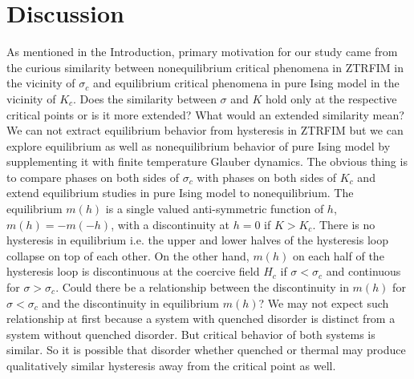 \documentclass[a4,aps,amsmath,floatfix,nofootinbib,10pt]{revtex4}
\begin{document}
\section{Discussion}


As mentioned in the Introduction, primary motivation for our study came 
from the curious similarity between nonequilibrium critical phenomena 
in ZTRFIM in the vicinity of $\sigma_c$ and equilibrium critical 
phenomena in pure Ising model in the vicinity of $K_c$. Does the 
similarity between $\sigma$ and $K$ hold only at the respective 
critical points or is it more extended? What would an extended 
similarity mean? We can not extract equilibrium behavior from 
hysteresis in ZTRFIM but we can explore equilibrium as well as 
nonequilibrium behavior of pure Ising model by supplementing it with 
finite temperature Glauber dynamics. The obvious thing is to compare 
phases on both sides of $\sigma_c$ with phases on both sides of $K_c$ 
and extend equilibrium studies in pure Ising model to nonequilibrium. 
The equilibrium $m(h)$ is a single valued anti-symmetric function of 
$h$, $m(h)=-m(-h)$, with a discontinuity at $h=0$ if $K > K_c$. There 
is no hysteresis in equilibrium i.e. the upper and lower halves of the 
hysteresis loop collapse on top of each other. On the other hand, 
$m(h)$ on each half of the hysteresis loop is discontinuous at the 
coercive field $H_c$ if $\sigma<\sigma_c$ and continuous for 
$\sigma>\sigma_c$. Could there be a relationship between the 
discontinuity in $m(h)$ for $\sigma < \sigma_c$ and the discontinuity 
in equilibrium $m(h)$? We may not expect such relationship at first 
because a system with quenched disorder is distinct from a system 
without quenched disorder. But critical behavior of both systems is 
similar. So it is possible that disorder whether quenched or thermal 
may produce qualitatively similar hysteresis away from the critical 
point as well.
\end{document}
